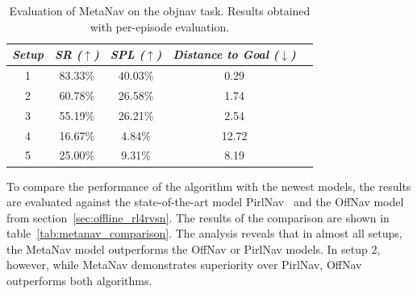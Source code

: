 \begin{table}
    \centering
    \begin{tabular}{c|cccc}
        \toprule
        \textit{\textbf{Setup}} & \textit{\textbf{SR ($\uparrow$)}} & \textbf{\textit{SPL ($\uparrow$)}} & \textit{\textbf{Distance to Goal ($\downarrow$)}} \\ \midrule
        1                       & 83.33\%                           & 40.03\%                            & 0.29                                              \\
        2                       & 60.78\%                           & 26.58\%                            & 1.74                                              \\
        3                       & 55.19\%                           & 26.21\%                            & 2.54                                              \\
        4                       & 16.67\%                           & 4.84\%                             & 12.72                                             \\
        5                       & 25.00\%                           & 9.31\%                             & 8.19                                              \\
    \end{tabular}
    \caption{Evaluation of MetaNav on the \acrshort{objnav} task. Results obtained with per-episode evaluation.}
    \label{tab:metanav_episode}
\end{table}

To compare the performance of the algorithm with the newest models, the results are evaluated against the state-of-the-art model PirlNav~\cite{ramrakhya2023} and the OffNav model from section~\ref{sec:offline_rl4rvsn}.
The results of the comparison are shown in table~\ref{tab:metanav_comparison}.
The analysis reveals that in almost all setups, the MetaNav model outperforms the OffNav or PirlNav models.
In setup 2, however, while MetaNav demonstrates superiority over PirlNav, OffNav outperforms both algorithms.

